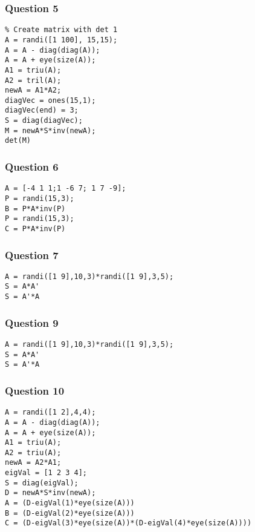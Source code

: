 \documentclass[11pt]{article}
\begin{document}
\subsubsection{Question 5}
\label{sec:orge735271}
\begin{verbatim}
% Create matrix with det 1
A = randi([1 100], 15,15);
A = A - diag(diag(A));
A = A + eye(size(A));
A1 = triu(A);
A2 = tril(A);
newA = A1*A2;
diagVec = ones(15,1);
diagVec(end) = 3;
S = diag(diagVec);
M = newA*S*inv(newA);
det(M)
\end{verbatim}
\subsubsection{Question 6}
\label{sec:orgc0f73e7}
\begin{verbatim}
A = [-4 1 1;1 -6 7; 1 7 -9];
P = randi(15,3);
B = P*A*inv(P)
P = randi(15,3);
C = P*A*inv(P)
\end{verbatim}
\subsubsection{Question 7}
\label{sec:orgfa55211}
\begin{verbatim}
A = randi([1 9],10,3)*randi([1 9],3,5);
S = A*A'
S = A'*A
\end{verbatim}
\subsubsection{Question 9}
\label{sec:org64a1cf2}
\begin{verbatim}
A = randi([1 9],10,3)*randi([1 9],3,5);
S = A*A' 
S = A'*A 
\end{verbatim}
\subsubsection{Question 10}
\label{sec:orgf05b500}
\begin{verbatim}
A = randi([1 2],4,4);
A = A - diag(diag(A));
A = A + eye(size(A));
A1 = triu(A);
A2 = triu(A);
newA = A2*A1;
eigVal = [1 2 3 4];
S = diag(eigVal);
D = newA*S*inv(newA);
A = (D-eigVal(1)*eye(size(A)))
B = (D-eigVal(2)*eye(size(A)))
C = (D-eigVal(3)*eye(size(A))*(D-eigVal(4)*eye(size(A))))
\end{verbatim}
\end{document}
